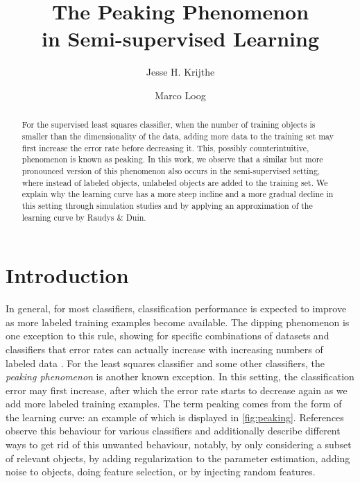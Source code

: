 \documentclass[runningheads,a4paper]{llncs}\usepackage[]{graphicx}\usepackage[]{color}
\begin{document}
\title{The Peaking Phenomenon\\ in Semi-supervised Learning}

\author{Jesse H. Krijthe \and Marco Loog}


			
\maketitle

\begin{abstract}
For the supervised least squares classifier, when the number of training objects is smaller than the dimensionality of the data, adding more data to the training set may first increase the error rate before decreasing it.  This, possibly counterintuitive, phenomenon is known as peaking. In this work, we observe that a similar but more pronounced version of this phenomenon also occurs in the semi-supervised setting, where instead of labeled objects, unlabeled objects are added to the training set. We explain why the learning curve has a more steep incline and a more gradual decline in this setting through simulation studies and by applying an approximation of the learning curve by Raudys \& Duin.
\end{abstract}




\section{Introduction}
In general, for most classifiers, classification performance is expected to improve as more labeled training examples become available. The dipping phenomenon is one exception to this rule, showing for specific combinations of datasets and classifiers that error rates can actually increase with increasing numbers of labeled data \cite{Loog2012}.  For the least squares classifier and some other classifiers, the \emph{peaking phenomenon} is another known exception. In this setting, the classification error may first increase, after which the error rate starts to decrease again as we add more labeled training examples. The term peaking comes from the form of the learning curve: an example of which is displayed in \cref{fig:peaking}.  References \cite{Duin1995,Skurichina1996,Opper1996,Opper2001} observe this behaviour for various classifiers and \cite{Duin1995,Skurichina1999,Opper2001} additionally describe different ways to get rid of this unwanted behaviour, notably, by only considering a subset of relevant objects, by adding regularization to the parameter estimation, adding noise to objects, doing feature selection, or by injecting random features.
\end{document}
